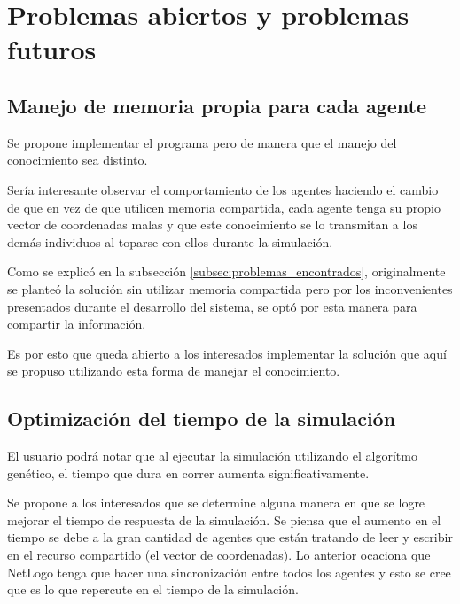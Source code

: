 \documentclass[times,10pt,twocolumn]{article}
\begin{document}
\section{Problemas abiertos y problemas futuros}

\subsection{Manejo de memoria propia para cada agente}
Se propone implementar el programa pero de manera que el manejo del conocimiento sea distinto.\par
Sería interesante observar el comportamiento de los agentes haciendo el cambio de que en vez de que utilicen memoria compartida, cada agente tenga su propio vector de coordenadas malas y que este conocimiento se lo transmitan a los demás individuos al toparse con ellos durante la simulación.\par
Como se explicó en la subsección \ref{subsec:problemas_encontrados}, originalmente se planteó la solución sin utilizar memoria compartida pero por los inconvenientes presentados durante el desarrollo del sistema, se optó por esta manera para compartir la información.\par
Es por esto que queda abierto a los interesados implementar la solución que aquí se propuso utilizando esta forma de manejar el conocimiento.

\subsection{Optimización del tiempo de la simulación}
El usuario podrá notar que al ejecutar la simulación utilizando el algorítmo genético, el tiempo que dura en correr aumenta significativamente.\par
Se propone a los interesados que se determine alguna manera en que se logre mejorar el tiempo de respuesta de la simulación. Se piensa que el aumento en el tiempo se debe a la gran cantidad de agentes que están tratando de leer y escribir en el recurso compartido (el vector de coordenadas). Lo anterior ocaciona que NetLogo tenga que hacer una sincronización entre todos los agentes y esto se cree que es lo que repercute en el tiempo de la simulación.


\end{document}

